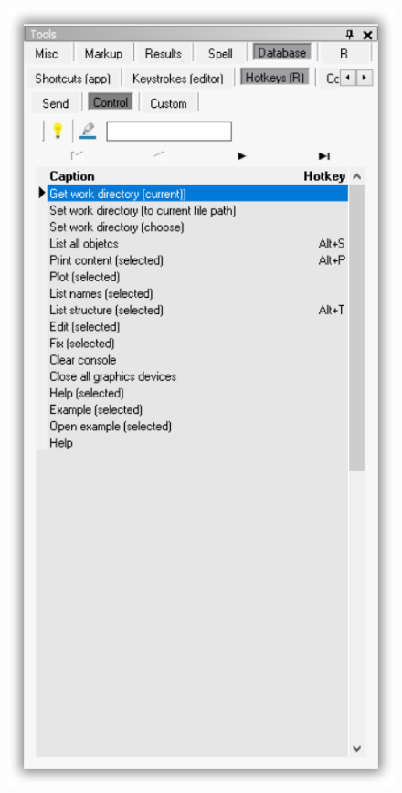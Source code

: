 \begin{figure}[H]
  \includegraphics[scale=0.35]{./res/tools_database_rh_control.png}\\

\end{figure}
